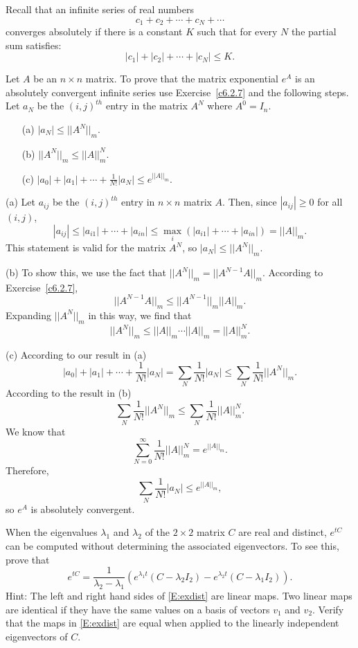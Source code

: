 \documentclass{ximera}
\begin{document}
\begin{exercise} \label{c6.2.8}
Recall that an infinite series of real numbers
\[
c_1+c_2 +\cdots+c_N + \cdots
\]
converges absolutely if there is a constant $K$ such that for every $N$
the partial sum satisfies:
\[
|c_1| + |c_2| + \cdots + |c_N| \leq K.
\]

Let $A$ be an $n\times n$ matrix.  To prove that the matrix exponential $e^A$
is an absolutely convergent infinite series use Exercise~\ref{c6.2.7} and the
following steps.  Let $a_N$ be the $(i,j)^{th}$ entry in the matrix $A^N$
where $A^0=I_n$.
\begin{itemize}
\item[(a)]  $|a_N| \leq ||A^N||_m$.
\item[(b)]  $||A^N||_m \leq ||A||_m^N$.
\item[(c)]  $|a_0| + |a_1| + \cdots + \frac{1}{N!}|a_N| \leq e^{||A||_m}$.
\end{itemize}

\begin{solution}

(a) Let $a_{ij}$ be the $(i,j)^{th}$ entry in $n \times n$ matrix $A$. 
Then, since $|a_{ij}| \geq 0$ for all $(i,j)$,
\[ |a_{ij}| \leq |a_{i1}| + \cdots + |a_{in}| \leq
\max_i(|a_{i1}| + \cdots + |a_{in}|) = ||A||_m. \]
This statement is valid for the matrix $A^N$, so $|a_N| \leq ||A^N||_m$.

(b) To show this, we use the fact that $||A^N||_m = ||A^{N - 1}A||_m$.
According to Exercise~\ref{c6.2.7},
\[
||A^{N - 1}A||_m \leq ||A^{N - 1}||_m ||A||_m.
\]
Expanding $||A^N||_m$ in this way, we find that
\[
||A^N||_m \leq ||A||_m \cdots ||A||_m = ||A||^N_m.
\]

(c) According to our result in (a)
\[ |a_0| + |a_1| + \cdots + \frac{1}{N!}|a_N| = \sum_N
\frac{1}{N!}|a_N| \leq \sum_N \frac{1}{N!}||A^N||_m. \]
According to the result in (b)
\[ \sum_N \frac{1}{N!}||A^N||_m \leq \sum_N \frac{1}{N!}||A||^N_m. \]
We know that
\[ \sum_{N = 0}^{\infty} \frac{1}{N!}||A||^N_m = e^{||A||_m}.  \]
Therefore,
\[ \sum_N \frac{1}{N!}|a_N| \leq e^{||A||_m}, \]
so $e^A$ is absolutely convergent.





\end{solution}
\end{exercise}

\AEXER
\begin{exercise} \label{c6.3.14}
When the eigenvalues $\lambda_1$ and $\lambda_2$ of the $2\times 2$ 
matrix $C$ are real and distinct, $e^{tC}$ can be computed without determining 
the associated eigenvectors.  To see this, prove that
\begin{equation}  \label{E:exdist}
e^{tC} = \frac{1}{\lambda_2-\lambda_1}\left(e^{\lambda_1 t}(C-\lambda_2I_2) -
e^{\lambda_2 t}(C-\lambda_1I_2)\right).
\end{equation}
Hint:  The left and right hand sides of \eqref{E:exdist} are linear maps.  Two 
linear maps are identical if they have the same values on a basis of vectors 
$v_1$ and $v_2$.  Verify that the maps in \eqref{E:exdist} are equal when 
applied to the linearly independent eigenvectors of $C$.
\end{exercise}
\end{document}
